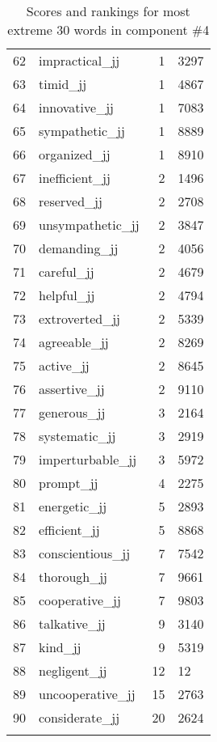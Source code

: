 \begin{longtable}[!htbp]{| rlr@{.}l |}
    62 & impractical\_jj & 1 & 3297 \\
    63 & timid\_jj & 1 & 4867 \\
    64 & innovative\_jj & 1 & 7083 \\
    65 & sympathetic\_jj & 1 & 8889 \\
    66 & organized\_jj & 1 & 8910 \\
    67 & inefficient\_jj & 2 & 1496 \\
    68 & reserved\_jj & 2 & 2708 \\
    69 & unsympathetic\_jj & 2 & 3847 \\
    70 & demanding\_jj & 2 & 4056 \\
    71 & careful\_jj & 2 & 4679 \\
    72 & helpful\_jj & 2 & 4794 \\
    73 & extroverted\_jj & 2 & 5339 \\
    74 & agreeable\_jj & 2 & 8269 \\
    75 & active\_jj & 2 & 8645 \\
    76 & assertive\_jj & 2 & 9110 \\
    77 & generous\_jj & 3 & 2164 \\
    78 & systematic\_jj & 3 & 2919 \\
    79 & imperturbable\_jj & 3 & 5972 \\
    80 & prompt\_jj & 4 & 2275 \\
    81 & energetic\_jj & 5 & 2893 \\
    82 & efficient\_jj & 5 & 8868 \\
    83 & conscientious\_jj & 7 & 7542 \\
    84 & thorough\_jj & 7 & 9661 \\
    85 & cooperative\_jj & 7 & 9803 \\
    86 & talkative\_jj & 9 & 3140 \\
    87 & kind\_jj & 9 & 5319 \\
    88 & negligent\_jj & 12 & 12 \\
    89 & uncooperative\_jj & 15 & 2763 \\
    90 & considerate\_jj & 20 & 2624 \\
    \hline
    \caption{Scores and rankings for most extreme 30 words in component \#4} \\
\end{longtable}
